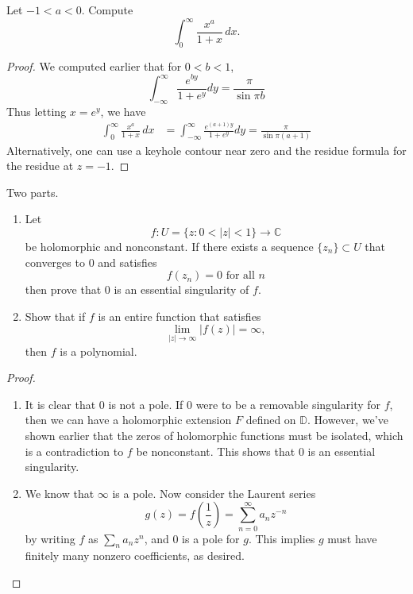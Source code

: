 \documentclass[openany]{book}
\newcommand{\D}{\mathbb{D}}
\begin{document}
\begin{prob}
Let $-1<a<0$. Compute
\[
\int_0^\infty \frac{x^a}{1+x}\,dx.
\]
\end{prob}
\begin{proof}
    We computed earlier that for $0<b<1$,
    \begin{equation*}
        \int_{-\infty}^\infty\frac{e^{by}}{1+e^y}dy=\frac{\pi}{\sin\pi b}
    \end{equation*}
    Thus letting $x=e^y$, we have 
    \begin{align*}
        \int_0^\infty \frac{x^a}{1+x}\,dx&=\int_{-\infty}^\infty\frac{e^{(a+1)y}}{1+e^y}dy=\frac{\pi}{\sin\pi(a+1)}
    \end{align*}
    Alternatively, one can use a keyhole contour near zero and the residue formula for the residue at $z=-1$.
\end{proof}


\begin{prob}
Two parts.

\begin{enumerate}
    \item[(1)] Let
    \[
    f:U=\{z:0<|z|<1\}\longrightarrow\mathbb{C}
    \]
    be holomorphic and nonconstant. If there exists a sequence
    $\{z_n\}\subset U$ that converges to $0$ and satisfies
    \[
    f(z_n)=0 \text{ for all } n
    \]
    then prove that $0$ is an essential singularity of $f$.

    \item[(2)] Show that if $f$ is an entire function that satisfies
    \[
    \lim_{|z|\to\infty}|f(z)|=\infty,
    \]
    then $f$ is a polynomial.
\end{enumerate}
\end{prob}
\begin{proof}
    \begin{enumerate}
        \item[(1)] It is clear that $0$ is not a pole. If $0$ were to be a removable singularity for $f$, then we can have a holomorphic extension $F$ defined on $\D$. However, we've shown earlier that the zeros of holomorphic functions must be isolated, which is a contradiction to $f$ be nonconstant. This shows that $0$ is an essential singularity.
        \item[(2)] We know that $\infty$ is a pole. Now consider the Laurent series 
        \begin{equation*}
            g(z)=f\left(\frac{1}{z}\right)=\sum_{n=0}^\infty a_nz^{-n}
        \end{equation*}
        by writing $f$ as $\sum_na_nz^n$, and $0$ is a pole for $g$. This implies $g$ must have finitely many nonzero coefficients, as desired.
    \end{enumerate}
\end{proof}
\end{document}
